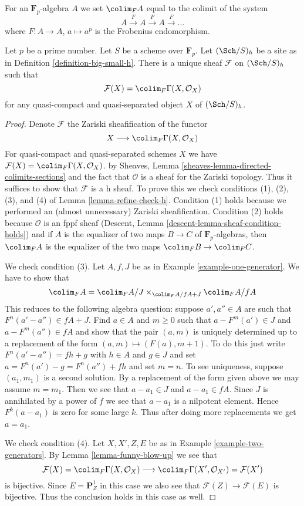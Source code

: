 \noindent
For an $\mathbf{F}_p$-algebra $A$
we set $\colim_F A$ equal to the colimit of the system
$$
A \xrightarrow{F} A \xrightarrow{F} A \xrightarrow{F} \ldots
$$
where $F : A \to A$, $a \mapsto a^p$ is the Frobenius endomorphism.

\begin{lemma}
\label{lemma-h-sheaf-colim-F}
Let $p$ be a prime number. Let $S$ be a scheme over $\mathbf{F}_p$.
Let $(\Sch/S)_h$ be a site as in Definition \ref{definition-big-small-h}.
There is a unique sheaf $\mathcal{F}$ on $(\Sch/S)_h$ such that
$$
\mathcal{F}(X) = \colim_F \Gamma(X, \mathcal{O}_X)
$$
for any quasi-compact and quasi-separated object $X$ of $(\Sch/S)_h$.
\end{lemma}

\begin{proof}
Denote $\mathcal{F}$ the Zariski sheafification
of the functor
$$
X \longrightarrow \colim_F \Gamma(X, \mathcal{O}_X)
$$
For quasi-compact and quasi-separated schemes $X$
we have $\mathcal{F}(X) = \colim_F \Gamma(X, \mathcal{O}_X)$.
by Sheaves, Lemma \ref{sheaves-lemma-directed-colimits-sections}
and the fact that $\mathcal{O}$ is a sheaf for the Zariski topology.
Thus it suffices to show that $\mathcal{F}$ is a h sheaf.
To prove this we check conditions (1), (2), (3), and (4) of
Lemma \ref{lemma-refine-check-h}.
Condition (1) holds because we performed an (almost unnecessary)
Zariski sheafification. Condition (2) holds because
$\mathcal{O}$ is an fppf sheaf (Descent, Lemma
\ref{descent-lemma-sheaf-condition-holds}) and if
$A$ is the equalizer of two maps $B \to C$ of $\mathbf{F}_p$-algebras,
then $\colim_F A$ is the equalizer of the two maps
$\colim_F B \to \colim_F C$.

\medskip\noindent
We check condition (3). Let $A, f, J$ be as in
Example \ref{example-one-generator}.
We have to show that
$$
\colim_F A = \colim_F A/J \times_{\colim_F A/fA + J} \colim_F A/fA
$$
This reduces to the following algebra question: suppose $a', a'' \in A$
are such that $F^n(a' - a'') \in fA + J$. Find $a \in A$ and $m \geq 0$
such that $a - F^m(a') \in J$ and $a - F^m(a'') \in fA$ and show that
the pair $(a, m)$ is uniquely determined up to a replacement of the
form $(a, m) \mapsto (F(a), m + 1)$.
To do this just write $F^n(a' - a'') = f h + g$ with $h \in A$ and $g \in J$
and set $a = F^n(a') - g = F^n(a'') + fh$ and set $m = n$.
To see uniqueness, suppose $(a_1, m_1)$ is a second solution.
By a replacement of the form given above we may assume $m = m_1$.
Then we see that $a - a_1 \in J$ and $a - a_1 \in fA$.
Since $J$ is annihilated by a power of $f$ we see that
$a - a_1$ is a nilpotent element. Hence $F^k(a - a_1)$ is zero
for some large $k$. Thus after doing more replacements we get
$a = a_1$.

\medskip\noindent
We check condition (4). Let $X, X', Z, E$ be as in
Example \ref{example-two-generators}. By
Lemma \ref{lemma-funny-blow-up} we see that
$$
\mathcal{F}(X) = \colim_F \Gamma(X, \mathcal{O}_X)
\longrightarrow
\colim_F \Gamma(X', \mathcal{O}_{X'}) = \mathcal{F}(X')
$$
is bijective. Since $E = \mathbf{P}^1_Z$ in this case we also
see that $\mathcal{F}(Z) \to \mathcal{F}(E)$ is bijective.
Thus the conclusion holds in this case as well.
\end{proof}

